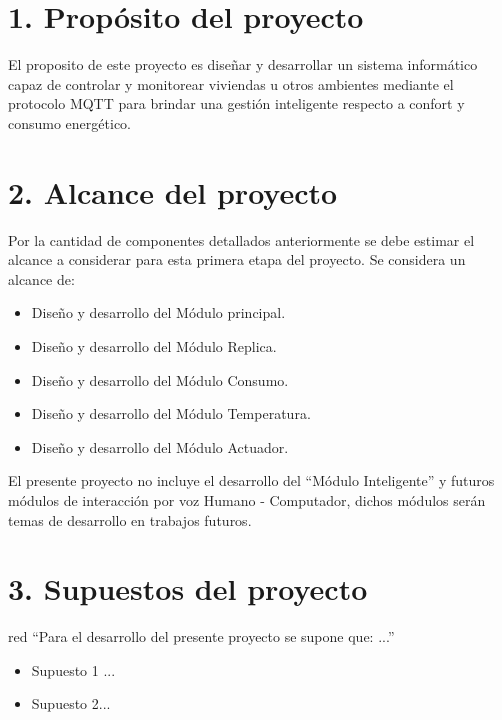\documentclass[11pt]{charter}
\begin{document}
\section{1. Propósito del proyecto}
\label{sec:proposito}

El proposito de este proyecto es diseñar y desarrollar un sistema informático capaz de controlar y monitorear viviendas u otros ambientes mediante el protocolo MQTT para brindar una gestión inteligente respecto a confort y consumo energético.


\section{2. Alcance del proyecto}
\label{sec:alcance}

Por la cantidad de componentes detallados anteriormente se debe estimar el alcance a considerar para esta primera etapa del proyecto. Se considera un alcance de: 
\begin{itemize}
\item Diseño y desarrollo del Módulo principal.
\item Diseño y desarrollo del Módulo Replica.
\item Diseño y desarrollo del Módulo Consumo.
\item Diseño y desarrollo del Módulo Temperatura.
\item Diseño y desarrollo del Módulo Actuador.
\end{itemize}

El presente proyecto no incluye el desarrollo del ``Módulo Inteligente'' y futuros módulos de interacción por voz Humano - Computador, dichos módulos serán temas de desarrollo en trabajos futuros.

\section{3. Supuestos del proyecto}
\label{sec:supuestos}

\begin{consigna}{red}
``Para el desarrollo del presente proyecto se supone que: ...''
\begin{itemize}
\item Supuesto 1 ...
\item Supuesto 2...
\end{itemize}


\end{consigna}
\end{document}
